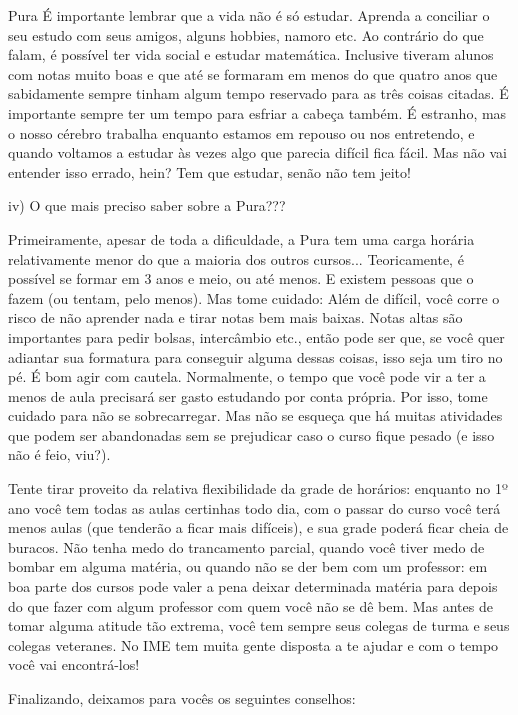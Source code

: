\begin{subsecao}{Pura}
É importante lembrar que a vida não é só estudar. Aprenda a conciliar o seu estudo
com seus amigos, alguns hobbies, namoro etc. Ao contrário do que falam, é
possível ter vida social e estudar matemática. Inclusive tiveram alunos com notas
muito boas e que até se formaram em menos do que quatro anos que sabidamente
sempre tinham algum tempo reservado para as três coisas citadas. É importante
sempre ter um tempo para esfriar a cabeça também. É estranho, mas o nosso cérebro
trabalha enquanto estamos em repouso ou nos entretendo, e quando voltamos a estudar
às vezes algo que parecia difícil fica fácil. Mas não vai entender isso errado,
hein? Tem que estudar, senão não tem jeito!

iv) O que mais preciso saber sobre a Pura???

Primeiramente, apesar de toda a dificuldade, a Pura tem uma carga horária
relativamente menor do que a maioria dos outros cursos... Teoricamente, é
possível se formar em 3 anos e meio, ou até menos. E existem pessoas que o
fazem (ou tentam, pelo menos). Mas tome cuidado: Além de difícil, você
corre o risco de não aprender nada e tirar notas bem mais baixas. Notas altas
são importantes para pedir bolsas, intercâmbio etc., então pode ser que, se você
quer adiantar sua formatura para conseguir alguma dessas coisas, isso seja um
tiro no pé. É bom agir com cautela. Normalmente, o tempo que você pode vir a ter
a menos de aula precisará ser gasto estudando por conta própria. Por isso, tome
cuidado para não se sobrecarregar. Mas não se esqueça que há muitas atividades
que podem ser abandonadas sem se prejudicar caso o curso fique pesado (e isso não é feio, viu?).

Tente tirar proveito da relativa flexibilidade da grade de horários: enquanto
no 1º ano você tem todas as aulas certinhas todo dia, com o passar do
curso você terá menos aulas (que tenderão a ficar mais difíceis), e sua
grade poderá ficar cheia de buracos. Não tenha medo do trancamento parcial,
quando você tiver medo de bombar em alguma matéria, ou quando não se der bem com
um professor: em boa parte dos cursos pode valer a pena deixar determinada
matéria para depois do que fazer com algum professor com quem você não se dê
bem. Mas antes de tomar alguma atitude tão extrema, você tem sempre seus colegas
de turma e seus colegas veteranes. No IME tem muita gente disposta a te ajudar e
com o tempo você vai encontrá-los!

Finalizando, deixamos para vocês os seguintes conselhos:
\begin{enumerate}


\end{enumerate}
\end{subsecao}
